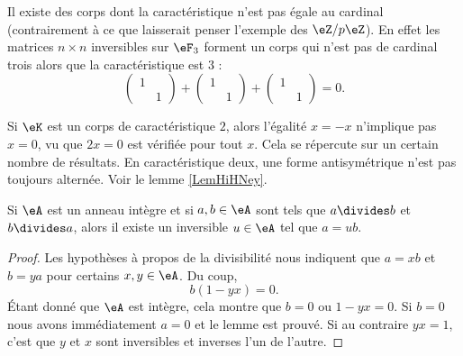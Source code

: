 \begin{example}
    Il existe des corps dont la caractéristique n'est pas égale au cardinal (contrairement à ce que laisserait penser l'exemple des \( \eZ/p\eZ\)). En effet les matrices \( n\times n\) inversibles sur \( \eF_{3}\) forment un corps qui n'est pas de cardinal trois alors que la caractéristique est \( 3\) :
    \begin{equation}
        \begin{pmatrix}
            1    &       \\ 
                &   1    
            \end{pmatrix}+\begin{pmatrix}
                1    &       \\ 
                    &   1    
                \end{pmatrix}+\begin{pmatrix}
                    1    &       \\ 
                        &   1    
                \end{pmatrix}=0.
    \end{equation}
\end{example}

\begin{example}
    Si \( \eK\) est un corps de caractéristique \( 2\), alors l'égalité \( x=-x\) n'implique pas \( x=0\), vu que \( 2x=0\) est vérifiée pour tout \( x\). Cela se répercute sur un certain nombre de résultats. En caractéristique deux, une forme antisymétrique n'est pas toujours alternée. Voir le lemme \ref{LemHiHNey}.
\end{example}


\begin{lemma}\label{LemRmVTRq}
    Si \( \eA\) est un anneau intègre et si \( a,b\in \eA\) sont tels que \( a\divides b\) et \( b\divides a\), alors il existe un inversible \( u\in \eA\) tel que \( a=ub\).
\end{lemma}

\begin{proof}
    Les hypothèses à propos de la divisibilité nous indiquent que \( a=xb\) et \( b=ya\) pour certains \( x,y\in \eA\). Du coup,
    \begin{equation}
        b(1-yx)=0.
    \end{equation}
    Étant donné que \( \eA\) est intègre, cela montre que \( b=0\) ou \( 1-yx=0\). Si \( b=0\) nous avons immédiatement \( a=0\) et le lemme est prouvé. Si au contraire \( yx=1\), c'est que \( y\) et \( x\) sont inversibles et inverses l'un de l'autre.
\end{proof}

